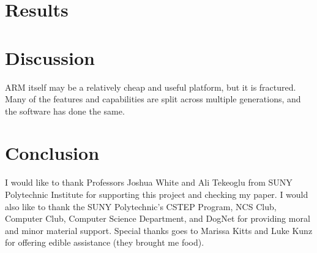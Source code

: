 \documentclass[12pt]{spieman}  %
\begin{document}
\section{Results}
\label{sec:results}


\section{Discussion}
\label{sec:discussion}

ARM itself may be a relatively cheap and useful platform, but it is fractured. Many of the features and capabilities are split across multiple generations, and the software has done the same.

\section{Conclusion}
\label{sec:conclusion}



\appendix
\acknowledgments 
I would like to thank Professors Joshua White and Ali Tekeoglu from SUNY Polytechnic Institute for supporting this project and checking my paper. I would also like to thank the SUNY Polytechnic's CSTEP Program, NCS Club, Computer Club, Computer Science Department, and DogNet for providing moral and minor material support. Special thanks goes to Marissa Kitts and Luke Kunz for offering edible assistance (they brought me food).


\end{document}
